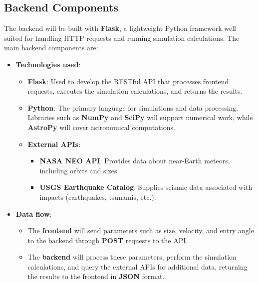 \documentclass[conference]{IEEEtran}
\begin{document}
\subsection{Backend Components}
The backend will be built with \textbf{Flask}, a lightweight Python framework
well suited for handling HTTP requests and running simulation calculations. The
main backend components are:
\begin{itemize}
	\item \textbf{Technologies used}:
	      \begin{itemize}
		      \item \textbf{Flask}: Used to develop the RESTful API that processes
		            frontend requests, executes the simulation calculations, and
		            returns the results.
		      \item \textbf{Python}: The primary language for simulations and data
		            processing. Libraries such as \textbf{NumPy} and \textbf{SciPy}
		            will support numerical work, while \textbf{AstroPy} will cover
		            astronomical computations.
		      \item \textbf{External APIs}:
		            \begin{itemize}
			            \item \textbf{NASA NEO API}: Provides data about near-Earth
			                  meteors, including orbits and sizes.
			            \item \textbf{USGS Earthquake Catalog}: Supplies seismic data
			                  associated with impacts (earthquakes, tsunamis, etc.).
		            \end{itemize}
	      \end{itemize}
	\item \textbf{Data flow}:
	      \begin{itemize}
		      \item The \textbf{frontend} will send parameters such as size,
		            velocity, and entry angle to the backend through \textbf{POST}
		            requests to the API.
		      \item The \textbf{backend} will process these parameters, perform the
		            simulation calculations, and query the external APIs for
		            additional data, returning the results to the frontend in
		            \textbf{JSON} format.
	      \end{itemize}
\end{itemize}
\end{document}
